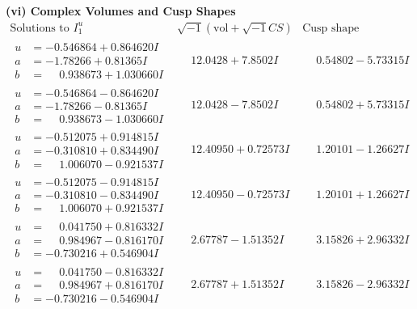 \documentclass[1p]{elsarticle_modified}
\theoremstyle{definition}
\newcommand{\I}{\sqrt{-1}}
\begin{document}
\newpage\flushleft \textbf{(vi) Complex Volumes and Cusp Shapes}
$$\begin{array}{c|c|c}  
\text{Solutions to }I^u_{1}& \I (\text{vol} + \sqrt{-1}CS) & \text{Cusp shape}\\
 \hline 
\begin{aligned}
u &= -0.546864 + 0.864620 I \\
a &= -1.78266 + 0.81365 I \\
b &= \phantom{-}0.938673 + 1.030660 I\end{aligned}
 & \phantom{-}12.0428 + 7.8502 I & \phantom{-}0.54802 - 5.73315 I \\ \hline\begin{aligned}
u &= -0.546864 - 0.864620 I \\
a &= -1.78266 - 0.81365 I \\
b &= \phantom{-}0.938673 - 1.030660 I\end{aligned}
 & \phantom{-}12.0428 - 7.8502 I & \phantom{-}0.54802 + 5.73315 I \\ \hline\begin{aligned}
u &= -0.512075 + 0.914815 I \\
a &= -0.310810 + 0.834490 I \\
b &= \phantom{-}1.006070 - 0.921537 I\end{aligned}
 & \phantom{-}12.40950 + 0.72573 I & \phantom{-}1.20101 - 1.26627 I \\ \hline\begin{aligned}
u &= -0.512075 - 0.914815 I \\
a &= -0.310810 - 0.834490 I \\
b &= \phantom{-}1.006070 + 0.921537 I\end{aligned}
 & \phantom{-}12.40950 - 0.72573 I & \phantom{-}1.20101 + 1.26627 I \\ \hline\begin{aligned}
u &= \phantom{-}0.041750 + 0.816332 I \\
a &= \phantom{-}0.984967 - 0.816170 I \\
b &= -0.730216 + 0.546904 I\end{aligned}
 & \phantom{-}2.67787 - 1.51352 I & \phantom{-}3.15826 + 2.96332 I \\ \hline\begin{aligned}
u &= \phantom{-}0.041750 - 0.816332 I \\
a &= \phantom{-}0.984967 + 0.816170 I \\
b &= -0.730216 - 0.546904 I\end{aligned}
 & \phantom{-}2.67787 + 1.51352 I & \phantom{-}3.15826 - 2.96332 I \\ \hline\begin{aligned}

\end{aligned}
\end{array}$$
\end{document}
